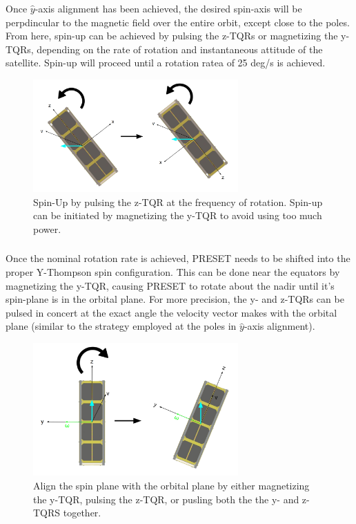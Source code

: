 \documentclass{article}
\begin{document}
Once $\hat{y}$-axis alignment has been achieved, the desired spin-axis will be perpdincular to the magnetic field over the entire orbit, except close to the poles. From here, spin-up can be achieved by pulsing the z-TQRs or magnetizing the y-TQRs, depending on the rate of rotation and instantaneous attitude of the satellite. Spin-up will proceed until a rotation ratea of 25 deg/s is achieved.

\begin{figure}[H]
    \centering
    \includegraphics[width=0.7\textwidth]{Spin-Up.png}
    \caption{Spin-Up by pulsing the z-TQR at the frequency of rotation. Spin-up can be initiated by magnetizing the y-TQR to avoid using too much power.}
    \label{fig:enter-label}
\end{figure} 

\subsubsection{\color{black}{Orbital Plane Alignment}}

Once the nominal rotation rate is achieved, PRESET needs to be shifted into the proper Y-Thompson spin configuration. This can be done near the equators by magnetizing the y-TQR, causing PRESET to rotate about the nadir until it's spin-plane is in the orbital plane. For more precision, the y- and z-TQRs can be pulsed in concert at the exact angle the velocity vector makes with the orbital plane (similar to the strategy employed at the poles in $\hat{y}$-axis alignment).

\begin{figure}[H]
    \centering
    \includegraphics[width=0.7\textwidth]{Orbital Plane Alignment.png}
    \caption{Align the spin plane with the orbital plane by either magnetizing the y-TQR, pulsing the z-TQR, or pusling both the the y- and z-TQRS together.}
    \label{fig:enter-label}
\end{figure}
\end{document}
